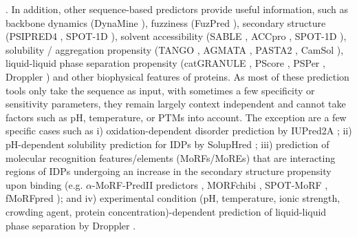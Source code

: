 \cite{zhang_intrinsically_2013, katuwawala_computational_2019}. In addition, other sequence-based predictors provide useful information, such as backbone dynamics (DynaMine \cite{cilia_protein_2013, cilia_dynamine_2014}), fuzziness (FuzPred \cite{horvath_sequence-based_2020, miskei_sequence-based_2020}), secondary structure (PSIPRED4 \cite{jones_protein_1999}, SPOT-1D \cite{singh_spot-1d-single_2021}), solvent accessibility (SABLE \cite{adamczak_accurate_2004}, ACCpro \cite{magnan_ssproaccpro_2014}, SPOT-1D \cite{singh_spot-1d-single_2021}), solubility / aggregation propensity (TANGO \cite{fernandez-escamilla_prediction_2004}, AGMATA \cite{orlando_accurate_2020}, PASTA2 \cite{walsh_pasta_2014}, CamSol \cite{sormanni_camsol_2015}), liquid-liquid phase separation propensity (catGRANULE \cite{bolognesi_concentration-dependent_2016}, PScore \cite{vernon_pi-pi_2018}, PSPer \cite{orlando_computational_2019}, Droppler \cite{raimondi_silico_2021}) and other biophysical features of proteins. As most of these prediction tools only take the sequence as input, with sometimes a few specificity or sensitivity parameters, they remain largely context independent and cannot take factors such as pH, temperature, or PTMs into account. The exception are a few specific cases such as i) oxidation-dependent disorder prediction by IUPred2A \cite{meszaros_iupred2a_2018}; ii) pH-dependent solubility prediction for IDPs by SolupHred \cite{santos_disphred_2020, santos_ph-dependent_2020, pintado_soluphred_2021}; iii) prediction of molecular recognition features/elements (MoRFs/MoREs) that are interacting regions of IDPs undergoing an increase in the secondary structure propensity upon binding (e.g. $\alpha$-MoRF-PredII predictors \cite{oldfield_coupled_2005, cheng_mining_2007}, MORFchibi \cite{malhis_morfchibi_2016}, SPOT-MoRF \cite{hanson_identifying_2020}, fMoRFpred \cite{yan_molecular_2016}); and iv) experimental condition (pH, temperature, ionic strength, crowding agent, protein concentration)-dependent prediction of liquid-liquid phase separation by Droppler \cite{raimondi_silico_2021}.


